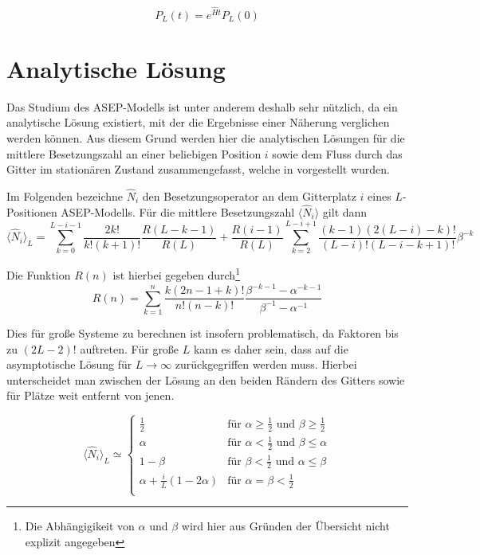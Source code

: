 \documentclass[10pt,a4paper]{report}
\begin{document}
\begin{equation}\label{ASEP_solution_equ}
P_L(t)=e^{\hat{H}t}P_L(0)
\end{equation}

\section{Analytische Lösung}

Das Studium des ASEP-Modells ist unter anderem deshalb sehr nützlich, da ein analytische Lösung existiert, mit der die Ergebnisse einer Näherung verglichen werden können. Aus diesem Grund werden hier die analytischen Lösungen für die mittlere Besetzungszahl an einer beliebigen Position $i$ sowie dem Fluss durch das Gitter im stationären Zustand zusammengefasst, welche in \cite{ASEP} vorgestellt wurden.

Im Folgenden bezeichne $\hat{N}_i$ den Besetzungsoperator an dem Gitterplatz $i$ eines $L$-Positionen ASEP-Modells. Für die mittlere Besetzungszahl $\langle\hat{N}_i\rangle$ gilt dann
\begin{equation}
\langle\hat{N}_i\rangle_L=\sum_{k=0}^{L-i-1}\frac{2k!}{k!(k+1)!}\frac{R(L-k-1)}{R(L)}+\frac{R(i-1)}{R(L)}\sum_{k=2}^{L-i+1}\frac{(k-1)(2(L-i)-k)!}{(L-i)!(L-i-k+1)!}\beta^{-k}
\end{equation}

Die Funktion $R(n)$ ist hierbei gegeben durch\footnote{Die Abhängigikeit von $\alpha$ und $\beta$ wird hier aus Gründen der Übersicht nicht explizit angegeben}
\begin{equation}
R(n)=\sum_{k=1}^{n}\frac{k(2n-1+k)!}{n!(n-k)!}\frac{\beta^{-k-1}-\alpha^{-k-1}}{\beta^{-1}-\alpha^{-1}}
\end{equation}

Dies für große Systeme zu berechnen ist insofern problematisch, da Faktoren bis zu $(2L-2)!$ auftreten. Für große $L$ kann es daher sein, dass auf die asymptotische Lösung für $L\rightarrow\infty$ zurückgegriffen werden muss. Hierbei unterscheidet man zwischen der Lösung an den beiden Rändern des Gitters sowie für Plätze weit entfernt von jenen.

\begin{equation}\label{density_equ}
\langle\hat{N}_i\rangle_L\simeq
\begin{cases}
\frac{1}{2}&\text{für }\alpha\geq\frac{1}{2}\text{ und }\beta\geq\frac{1}{2}\\
\alpha&\text{für }\alpha<\frac{1}{2}\text{ und }\beta\leq\alpha\\
1-\beta&\text{für }\beta<\frac{1}{2}\text{ und }\alpha\leq\beta\\
\alpha+\frac{i}{L}(1-2\alpha)&\text{für }\alpha=\beta<\frac{1}{2}\\
\end{cases}
\end{equation}
\end{document}
